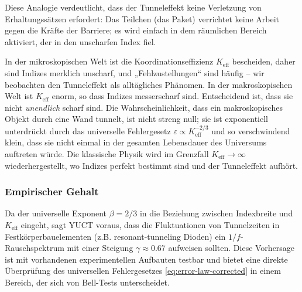 \documentclass[12pt,a4paper]{article}
\theoremstyle{remark}
\begin{document}
	Diese Analogie verdeutlicht, dass der Tunneleffekt keine Verletzung von Erhaltungssätzen erfordert: Das Teilchen (das Paket) verrichtet keine Arbeit gegen die Kräfte der Barriere; es wird einfach in dem räumlichen Bereich aktiviert, der in den unscharfen Index fiel.
	
	In der mikroskopischen Welt ist die Koordinationseffizienz \(K_{\mathrm{eff}}\) bescheiden, daher sind Indizes merklich unscharf, und „Fehlzustellungen“ sind häufig – wir beobachten den Tunneleffekt als alltägliches Phänomen. In der makroskopischen Welt ist \(K_{\mathrm{eff}}\) enorm, so dass Indizes messerscharf sind. Entscheidend ist, dass sie nicht \emph{unendlich} scharf sind. Die Wahrscheinlichkeit, dass ein makroskopisches Objekt durch eine Wand tunnelt, ist nicht streng null; sie ist exponentiell unterdrückt durch das universelle Fehlergesetz \(\varepsilon \propto K_{\mathrm{eff}}^{-2/3}\) und so verschwindend klein, dass sie nicht einmal in der gesamten Lebensdauer des Universums auftreten würde. Die klassische Physik wird im Grenzfall \(K_{\mathrm{eff}} \to \infty\) wiederhergestellt, wo Indizes perfekt bestimmt sind und der Tunneleffekt aufhört.
	
	\subsubsection{Empirischer Gehalt}
	
	Da der universelle Exponent $\beta=2/3$ in die Beziehung zwischen Indexbreite und $K_{\mathrm{eff}}$ eingeht, sagt YUCT voraus, dass die Fluktuationen von Tunnelzeiten in Festkörperbauelementen (z.B. resonant-tunneling Dioden) ein $1/f$-Rauschspektrum mit einer Steigung $\gamma \approx 0.67$ aufweisen sollten. Diese Vorhersage ist mit vorhandenen experimentellen Aufbauten testbar und bietet eine direkte Überprüfung des universellen Fehlergesetzes \eqref{eq:error-law-corrected} in einem Bereich, der sich von Bell-Tests unterscheidet.
	
	\medskip
	
\end{document}
